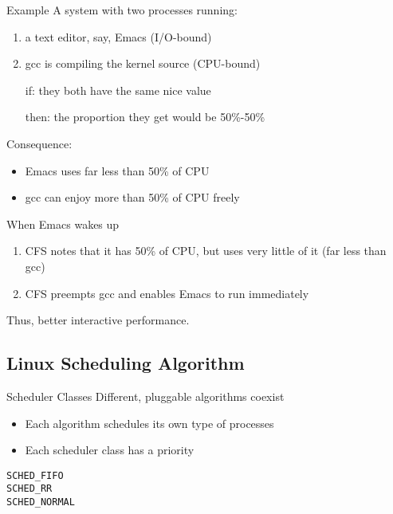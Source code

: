 \begin{frame}{Example}
  A system with two processes running:
  \begin{enumerate}
  \item a text editor, say, Emacs (I/O-bound)
  \item gcc is compiling the kernel source (CPU-bound)
  \end{enumerate}
  \begin{itemize}
  \item[if:] they both have the same nice value
  \item[then:] the proportion they get would be 50\%-50\%
  \end{itemize}
  Consequence:
  \begin{itemize}
  \item Emacs uses far less than 50\% of CPU
  \item gcc can enjoy more than 50\% of CPU freely
  \end{itemize}
  When Emacs wakes up
  \begin{enumerate}
  \item CFS notes that it has 50\% of CPU, but uses very little of it (far less than gcc)
  \item CFS preempts gcc and enables Emacs to run immediately
  \end{enumerate}
  Thus, better interactive performance.
\end{frame}

\subsection{Linux Scheduling Algorithm}

\begin{frame}{Scheduler Classes}
  Different, pluggable algorithms coexist 
  \begin{itemize}
  \item Each algorithm schedules its own type of processes
  \item Each scheduler class has a priority
  \end{itemize}
  \begin{description}
  \item[\texttt{SCHED\_FIFO}]
  \item[\texttt{SCHED\_RR}]
  \item[\texttt{SCHED\_NORMAL}] 
  \end{description}
\end{frame}

